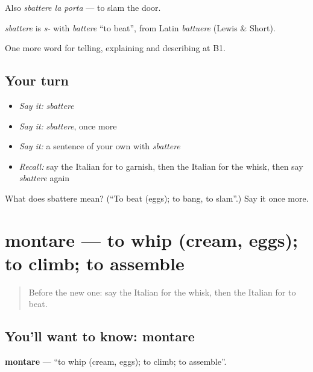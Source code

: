 Also \emph{sbattere la porta} — to slam the door.

\begin{cousinweb}
\emph{sbattere} is \emph{s-} with \emph{battere} \textquotedblleft{}to beat\textquotedblright{}, from Latin \emph{battuere} (Lewis \& Short).
\end{cousinweb}

\begin{grammarlens}[title={What you've built}]
One more word for telling, explaining and describing at B1.
\end{grammarlens}

\subsection*{Your turn}
\begin{itemize}
\raggedright
  \item \emph{Say it:} \emph{sbattere}
  \item \emph{Say it:} \emph{sbattere}, once more
  \item \emph{Say it:} a sentence of your own with \emph{sbattere}
  \item \emph{Recall:} say the Italian for to garnish, then the Italian for the whisk, then say \emph{sbattere} again
\end{itemize}

\begin{tcolorbox}[breakable,colback=teal!4,colframe=teal!35!black,title={Before you move on}]
What does sbattere mean? (\textquotedblleft{}To beat (eggs); to bang, to slam\textquotedblright{}.) Say it once more.
\end{tcolorbox}
\section[montare]{montare — to whip (cream, eggs); to climb; to assemble}

\label{lesson:IT-C338-montare}



\begin{quote}
Before the new one: say the Italian for the whisk, then the Italian for to beat.
\end{quote}

\subsection*{You'll want to know: montare}
\textbf{montare} — \textquotedblleft{}to whip (cream, eggs); to climb; to assemble\textquotedblright{}.

